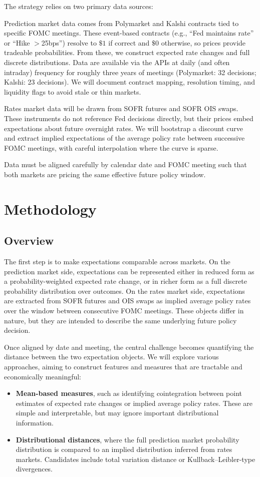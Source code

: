 \documentclass[11pt]{article}
\begin{document}
The strategy relies on two primary data sources:

Prediction market data comes from Polymarket and Kalshi contracts tied to specific FOMC meetings. These event-based contracts (e.g., ``Fed maintains rate'' or ``Hike $>$25bps'') resolve to $\$1$ if correct and $\$0$ otherwise, so prices provide tradeable probabilities. From these, we construct expected rate changes and full discrete distributions. Data are available via the APIs at daily (and often intraday) frequency for roughly three years of meetings (Polymarket: 32 decisions; Kalshi: 23 decisions). We will document contract mapping, resolution timing, and liquidity flags to avoid stale or thin markets.

Rates market data will be drawn from SOFR futures and SOFR OIS swaps. These instruments do not reference Fed decisions directly, but their prices embed expectations about future overnight rates. We will bootstrap a discount curve and extract implied expectations of the average policy rate between successive FOMC meetings, with careful interpolation where the curve is sparse.

Data must be aligned carefully by calendar date and FOMC meeting such that both markets are pricing the same effective future policy window.

\section{Methodology}
\subsection{Overview}

The first step is to make expectations comparable across markets. On the prediction market side, expectations can be represented either in reduced form as a probability-weighted expected rate change, or in richer form as a full discrete probability distribution over outcomes. On the rates market side, expectations are extracted from SOFR futures and OIS swaps as implied average policy rates over the window between consecutive FOMC meetings. These objects differ in nature, but they are intended to describe the same underlying future policy decision.

Once aligned by date and meeting, the central challenge becomes quantifying the distance between the two expectation objects. We will explore various approaches, aiming to construct features and measures that are tractable and economically meaningful:
\begin{itemize}
    \item \textbf{Mean-based measures}, such as identifying cointegration between point estimates of expected rate changes or implied average policy rates. These are simple and interpretable, but may ignore important distributional information.
    \item \textbf{Distributional distances}, where the full prediction market probability distribution is compared to an implied distribution inferred from rates markets. Candidates include total variation distance or Kullback--Leibler-type divergences.
\end{itemize}
\end{document}
